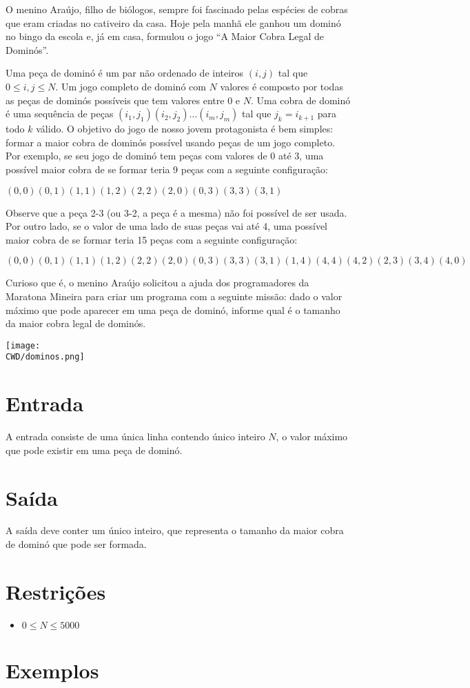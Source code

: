 O menino Araújo, filho de biólogos, sempre foi fascinado pelas espécies de cobras que eram criadas no cativeiro da casa.
 Hoje pela manhã ele ganhou um dominó no bingo da escola e, já em casa, formulou o jogo ``A Maior Cobra Legal de Dominós''.

Uma peça de dominó é um par não ordenado de inteiros $(i,j)$ tal que $0 \leq i, j \leq N$.
Um jogo completo de dominó com $N$ valores é composto por todas as peças de dominós possíveis que tem valores entre $0$ e $N$.
Uma cobra de dominó é uma sequência de peças $(i_1, j_1)(i_2, j_2)\dots(i_m, j_m)$ tal que $j_k = i_{k+1}$ para todo $k$ válido.
O objetivo do jogo de nosso jovem protagonista é bem simples: formar a maior cobra de dominós possível usando peças de um jogo completo.
 Por exemplo, se seu jogo de dominó tem peças com valores de $0$ até 3, uma possível maior cobra de se formar teria 9 peças com a seguinte configuração:

\begin{center}
  $( 0,0 )( 0,1 )( 1,1 )( 1,2 )( 2,2 )( 2,0 )( 0,3 )( 3,3 )( 3,1 )$
\end{center}

Observe que a peça 2-3 (ou 3-2, a peça é a mesma) não foi possível de ser usada.
Por outro lado, se o valor de uma lado de suas peças vai até 4, uma possível maior cobra de se formar teria 15 peças com a seguinte configuração:

\begin{center}
 $( 0,0 )( 0,1 )( 1,1 )( 1,2 )( 2,2 )( 2,0 )( 0,3 )( 3,3 )( 3,1 )( 1,4 )( 4,4 )( 4,2 )( 2,3 )( 3,4 )( 4,0 )$
\end{center}

Curioso que é, o menino Araújo solicitou a ajuda dos programadores da Maratona Mineira para criar um programa com a seguinte missão: dado o valor máximo que pode aparecer em uma peça de dominó, informe qual é o tamanho da maior cobra legal de dominós.


\begin{center}
  \texttt{[image: \\CWD/dominos.png]}
\end{center}


\section*{Entrada}

A entrada consiste de uma única linha contendo único inteiro $N$, o valor máximo que pode existir em uma peça de dominó.


\section*{Saída}

A saída deve conter um único inteiro, que representa o tamanho da maior cobra de dominó que pode ser formada.


\section*{Restrições}

\begin{itemize}
  \item $0 \leq N \leq 5000$
\end{itemize}

\section*{Exemplos}

\exemplo
